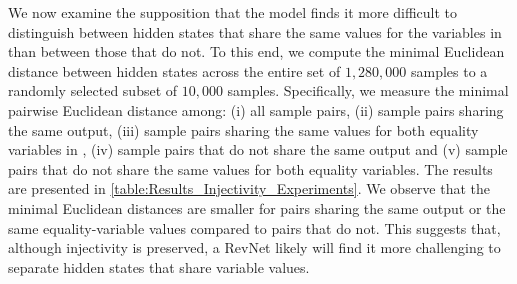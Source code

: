 \begin{table}
    \centering
    \caption{An approximation of the minimal Euclidean distance of the trained MLP model in the hierarchical equality task using $1{,}280{,}000$ samples. The minimal Euclidean distance is computed between all samples to a randomly selected subset of $10{,}000$ samples. 
    We compute it over 10 different random seeds and present the mean and standard deviation (the number after $\pm$).}
    \label{table:Results_Injectivity_Experiments}
\end{table}

We now examine the supposition that the model finds it more difficult to distinguish between hidden states that share the same values for the variables in \algbothequality than between those that do not. To this end, we compute the minimal Euclidean distance between hidden states across the entire set of $1{,}280{,}000$ samples to a randomly selected subset of $10{,}000$ samples. 
Specifically, we measure the minimal pairwise Euclidean distance among: (i) all sample pairs, (ii) sample pairs sharing the same output, (iii) sample pairs sharing the same values for both equality variables in \algbothequality, (iv) sample pairs that do not share the same output and (v) sample pairs that do not share the same values for both equality variables. 
The results are presented in \cref{table:Results_Injectivity_Experiments}. We observe that the minimal Euclidean distances are smaller for pairs sharing the same output or the same equality-variable values compared to pairs that do not. This suggests that, although injectivity is preserved, a RevNet likely will find it more challenging to separate hidden states that share variable values.

